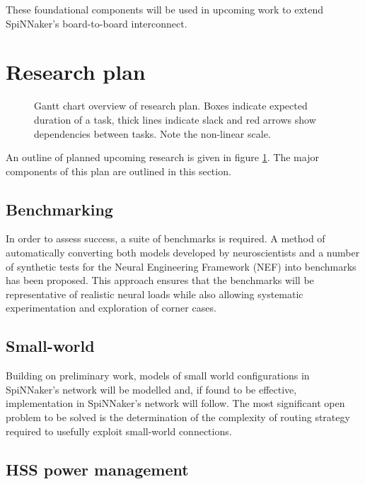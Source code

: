 		These foundational components will be used in upcoming work to extend
		SpiNNaker's board-to-board interconnect.


\section{Research plan}
	
	\begin{figure}
		\center
		
		
		\caption{Gantt chart overview of research plan. Boxes indicate expected
		duration of a task, thick lines indicate slack and red arrows show
		dependencies between tasks. Note the non-linear scale.}
		\label{fig:plan-gantt}
	\end{figure}
	
	An outline of planned upcoming research is given in figure
	\ref{fig:plan-gantt}. The major components of this plan are outlined in this
	section.
	
	\subsection{Benchmarking}
		
		In order to assess success, a suite of benchmarks is required. A method of
		automatically converting both models developed by neuroscientists and a
		number of synthetic tests for the Neural Engineering Framework (NEF)
		\cite{eliasmith04} into benchmarks has been proposed. This approach ensures
		that the benchmarks will be representative of realistic neural loads while
		also allowing systematic experimentation and exploration of corner cases.
	
	\subsection{Small-world}
		
		Building on preliminary work, models of small world configurations in
		SpiNNaker's network will be modelled and, if found to be effective,
		implementation in SpiNNaker's network will follow. The most significant open
		problem to be solved is the determination of the complexity of routing
		strategy required to usefully exploit small-world connections.
	
	\subsection{HSS power management}
		
